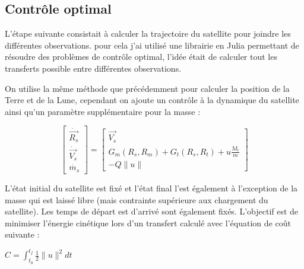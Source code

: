\documentclass[12pt]{article} %
\begin{document}
		\subsection{Contrôle optimal}
		
		L'étape suivante consistait à calculer la trajectoire du satellite pour joindre les différentes observations.
		pour cela j'ai utilisé une librairie en Julia permettant de résoudre des problèmes de contrôle optimal, l'idée était de calculer tout les transferts possible entre différentes observations.
		
		On utilise la même méthode que précédemment pour calculer la position de la Terre et de la Lune, cependant on ajoute un contrôle à la dynamique du satellite ainsi qu'un paramètre supplémentaire pour la masse :
		
		$$
		\begin{bmatrix}
			\dot{\overrightarrow{R_{s}}}\\
			\dot{\overrightarrow{V_{s}}}\\
			\dot{m_{s}}
		\end{bmatrix} =\begin{bmatrix}
			\overrightarrow{V_{s}}\\
			G_{m}(R_s,R_m)+G_{t}(R_s,R_t)+u\frac{M_{t}}{m}\\
			-Q\|u\|
		\end{bmatrix}
		$$
		
		L'état initial du satellite est fixé et l'état final l'est également à l'exception de la masse qui est laissé libre (mais contrainte supérieure aux chargement du satellite). Les temps de départ est d'arrivé sont également fixés.
		L'objectif est de minimiser l'énergie cinétique lors d'un transfert calculé avec l'équation de coût suivante :
		
		$C=\int_{t_0}^{t_f}\frac{1}{2}\|u\|^2dt$
		
\end{document}
